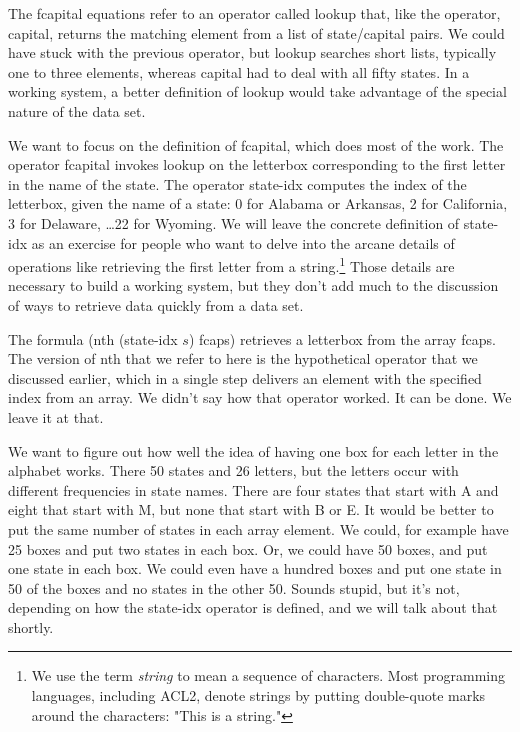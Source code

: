 The \textsf{fcapital} equations refer to an operator
called \textsf{lookup} that, like the operator, \textsf{capital},
returns the matching element from a list of state/capital pairs.
We could have stuck with the previous operator,
but \textsf{lookup} searches short lists,
typically one to three elements,
whereas \textsf{capital} had to deal with all fifty states.
In a working system,
a better definition of \textsf{lookup}
would take advantage of the special nature of the data set.

We want to focus on the definition of \textsf{fcapital},
which does most of the work.
The operator \textsf{fcapital} invokes \textsf{lookup}
on the letterbox corresponding to the first letter
in the name of the state.
The operator \textsf{state-idx} computes the index
of the letterbox, given the name of a state:
0 for Alabama or Arkansas, 2 for California,
3 for Delaware, \dots 22 for  Wyoming.
We will leave the concrete
definition of \textsf{state-idx} as an exercise for
people who want to delve into the arcane details of
operations like retrieving the first letter from a
string.\footnote{We use the term \emph{string}
to mean a sequence of characters.
Most programming languages, including ACL2,
denote strings by putting double-quote marks
around the characters: \textsf{"This is a string."}}
Those details are necessary to build a working system,
but they don't add much to the discussion of ways
to retrieve data quickly from a data set.

The formula
\textsf{(nth (state-idx $s$) fcaps)}
retrieves a letterbox from the array \textsf{fcaps}.
The version of \textsf{nth} that we refer to here
is the hypothetical operator that we discussed earlier,
which in a single step delivers an element
with the specified index from an array.
We didn't say how that operator worked.
It can be done. We leave it at that.

We want to figure out
how well the idea of having one box for each letter
in the alphabet works.
There 50 states and 26 letters, but the letters occur
with different frequencies in state names.
There are four states that start with A and
eight that start with M,
but none that start with B or E.
It would be better to put the same number of states in each
array element. We could, for example have 25 boxes and put
two states in each box. Or, we could have 50 boxes, and put
one state in each box.
We could even have a hundred boxes and put one state in 50
of the boxes and no states in the other 50.
Sounds stupid, but it's not, depending on how
the \textsf{state-idx} operator is defined,
and we will talk about that shortly.

